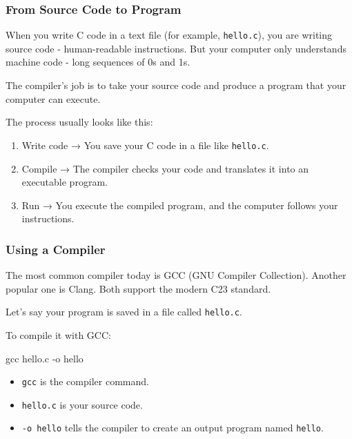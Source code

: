 \documentclass[
  letterpaper,
  DIV=11,
  numbers=noendperiod]{scrreprt}
\newenvironment{Shaded}{\begin{snugshade}}{\end{snugshade}}
\newcommand{\AttributeTok}[1]{\textcolor[rgb]{0.40,0.45,0.13}{#1}}
\newcommand{\FunctionTok}[1]{\textcolor[rgb]{0.28,0.35,0.67}{#1}}
\newcommand{\NormalTok}[1]{\textcolor[rgb]{0.00,0.23,0.31}{#1}}
\providecommand{\tightlist}{%
  \setlength{\itemsep}{0pt}\setlength{\parskip}{0pt}}
\begin{document}
\subsubsection{From Source Code to
Program}\label{from-source-code-to-program}

When you write C code in a text file (for example, \texttt{hello.c}),
you are writing source code - human-readable instructions. But your
computer only understands machine code - long sequences of 0s and 1s.

The compiler's job is to take your source code and produce a program
that your computer can execute.

The process usually looks like this:

\begin{enumerate}
\def\labelenumi{\arabic{enumi}.}
\tightlist
\item
  Write code → You save your C code in a file like \texttt{hello.c}.
\item
  Compile → The compiler checks your code and translates it into an
  executable program.
\item
  Run → You execute the compiled program, and the computer follows your
  instructions.
\end{enumerate}

\subsubsection{Using a Compiler}\label{using-a-compiler}

The most common compiler today is GCC (GNU Compiler Collection). Another
popular one is Clang. Both support the modern C23 standard.

Let's say your program is saved in a file called \texttt{hello.c}.

To compile it with GCC:

\begin{Shaded}
\begin{Highlighting}[]
\FunctionTok{gcc}\NormalTok{ hello.c }\AttributeTok{{-}o}\NormalTok{ hello}
\end{Highlighting}
\end{Shaded}

\begin{itemize}
\tightlist
\item
  \texttt{gcc} is the compiler command.
\item
  \texttt{hello.c} is your source code.
\item
  \texttt{-o\ hello} tells the compiler to create an output program
  named \texttt{hello}.
\end{itemize}
\end{document}

